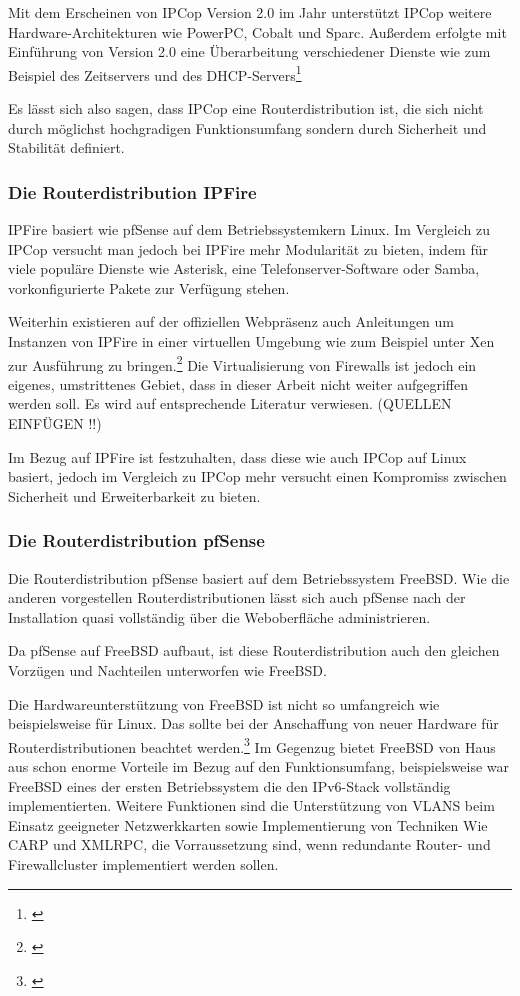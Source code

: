 \documentclass[a4paper,12pt]{scrartcl}
\begin{document}
Mit dem Erscheinen von IPCop Version 2.0 im Jahr unterst\"utzt IPCop weitere
Hardware-Architekturen wie PowerPC, Cobalt und
Sparc. Au\ss{}erdem erfolgte mit Einf\"uhrung
von Version 2.0 eine \"Uberarbeitung
verschiedener Dienste wie zum Beispiel des
Zeitservers und des DHCP-Servers\footnote{\cite{IPCop20Hardware}}

Es l\"asst sich also sagen, dass IPCop eine Routerdistribution ist, die sich
nicht durch m\"oglichst hochgradigen Funktionsumfang sondern durch Sicherheit
und Stabilit\"at definiert. 

\subsubsection{Die Routerdistribution IPFire}
IPFire basiert wie pfSense auf dem Betriebssystemkern Linux. Im Vergleich zu
IPCop versucht man jedoch bei IPFire mehr Modularit\"at zu bieten, indem f\"ur
viele popul\"are Dienste wie Asterisk, eine Telefonserver-Software oder Samba,
vorkonfigurierte Pakete zur Verf\"ugung stehen.

Weiterhin existieren auf der offiziellen Webpr\"asenz auch Anleitungen um
Instanzen von IPFire in einer virtuellen Umgebung wie zum Beispiel unter Xen
zur Ausf\"uhrung zu bringen.\footnote{\cite{IPFireAddons}} Die Virtualisierung
von Firewalls ist jedoch ein eigenes, umstrittenes Gebiet, dass in dieser
Arbeit nicht weiter aufgegriffen werden soll. Es wird auf entsprechende
Literatur verwiesen. (QUELLEN EINF\"UGEN !!)

Im Bezug auf IPFire ist festzuhalten, dass diese wie auch IPCop auf Linux
basiert, jedoch im Vergleich zu IPCop mehr versucht einen Kompromiss zwischen
Sicherheit und Erweiterbarkeit zu bieten.

\subsubsection{Die Routerdistribution pfSense}
Die Routerdistribution pfSense basiert auf dem Betriebssystem FreeBSD. Wie die
anderen vorgestellen Routerdistributionen l\"asst sich auch pfSense nach der
Installation quasi vollst\"andig \"uber die Weboberfl\"ache administrieren.

Da pfSense auf FreeBSD aufbaut, ist diese Routerdistribution auch den gleichen
Vorz\"ugen und Nachteilen unterworfen wie FreeBSD.

Die Hardwareunterst\"utzung von FreeBSD ist nicht so umfangreich wie
beispielsweise f\"ur Linux. Das sollte bei der Anschaffung von neuer Hardware
f\"ur Routerdistributionen beachtet werden.\footnote{\cite{FreeBSDHardware}} Im
Gegenzug bietet FreeBSD von Haus aus schon enorme Vorteile im Bezug auf den
Funktionsumfang, beispielsweise war FreeBSD eines der ersten Betriebssystem die
den IPv6-Stack vollst\"andig implementierten. Weitere Funktionen sind die
Unterst\"utzung von VLANS beim Einsatz geeigneter Netzwerkkarten sowie
Implementierung von Techniken Wie CARP und XMLRPC, die Vorraussetzung sind,
wenn redundante Router- und Firewallcluster implementiert werden sollen.
\end{document}
